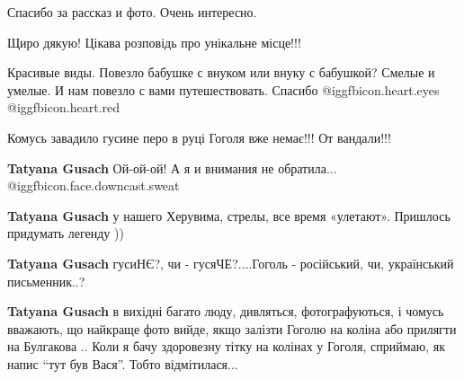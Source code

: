 \begin{itemize}
Спасибо за рассказ и фото. Очень интересно.

Щиро дякую! Цікава розповідь про унікальне місце!!!


Красивые виды. Повезло бабушке с внуком или внуку с бабушкой? Смелые и умелые.
И нам повезло с вами путешествовать.  Спасибо @igg{fbicon.heart.eyes}
@igg{fbicon.heart.red}

Комусь завадило гусине перо в руці Гоголя вже немає!!! От вандали!!!

\begin{itemize} %
\textbf{Tatyana Gusach} Ой-ой-ой!
А я и внимания не обратила... @igg{fbicon.face.downcast.sweat} 

\textbf{Tatyana Gusach} у нашего Херувима, стрелы, все время «улетают».
Пришлось придумать легенду ))

\textbf{Tatyana Gusach} гусиНЄ?, чи - гусяЧЕ?....Гоголь - російський, чи, український письменник..?

\textbf{Tatyana Gusach} в вихідні багато люду, дивляться, фотографуються, і чомусь вважають, що найкраще фото вийде, якщо залізти Гоголю на коліна або прилягти на Булгакова .. Коли я бачу здоровезну тітку на колінах у Гоголя, сприймаю, як напис \enquote{тут був Вася}. Тобто відмітилася...
\end{itemize} %

\end{itemize} %
